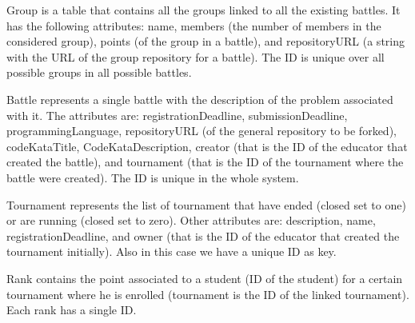 \documentclass[12pt, a4paper]{report}
\begin{document}
    Group is a table that contains all the groups linked to all the existing battles. 
    It has the following attributes: name, members (the number of members in the considered group), points (of the group in a battle), and repositoryURL (a string with the URL of the group repository for a battle).
    The ID is unique over all possible groups in all possible battles.
    
    Battle represents a single battle with the description of the problem associated with it. 
    The attributes are: registrationDeadline, submissionDeadline, programmingLanguage, repositoryURL (of the general repository to be forked), codeKataTitle, CodeKataDescription, creator (that is the ID of the educator that created the battle), and tournament (that is the ID of the tournament where the battle were created). 
    The ID is unique in the whole system. 

    Tournament represents the list of tournament that have ended (closed set to one) or are running (closed set to zero). 
    Other attributes are: description, name, registrationDeadline, and owner (that is the ID of the educator that created the tournament initially). 
    Also in this case we have a unique ID as key. 

    Rank contains the point associated to a student (ID of the student) for a certain tournament where he is enrolled (tournament is the ID of the linked tournament). 
    Each rank has a single ID. 
\end{document}
